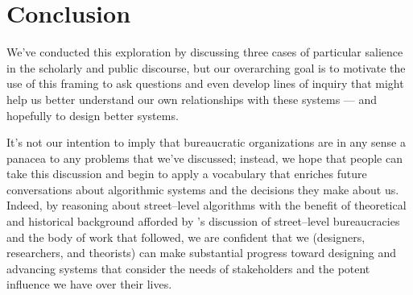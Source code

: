 \documentclass[main]{subfiles}
\begin{document}
\section{Conclusion}
We've conducted this exploration by discussing
three cases of particular salience in the scholarly and public discourse,
but our overarching goal is to motivate the use of this framing
to ask questions and even develop lines of inquiry that might help us
better understand our own relationships with these systems
--- and hopefully to design better systems.

It's not our intention to imply that bureaucratic organizations are
in any sense a panacea to any problems that we've discussed;
instead, we hope that people can take this discussion and
begin to apply a vocabulary that enriches future conversations about
algorithmic systems and the decisions they make about us.
Indeed, by reasoning about street--level algorithms with the benefit of theoretical and historical background afforded by \citeauthor{lipsky1983street}'s discussion of street--level bureaucracies and the body of work that followed,
we are confident that we (designers, researchers, and theorists) can make substantial progress toward designing and advancing systems that consider the needs of stakeholders and the potent influence we have over their lives.




\end{document}
